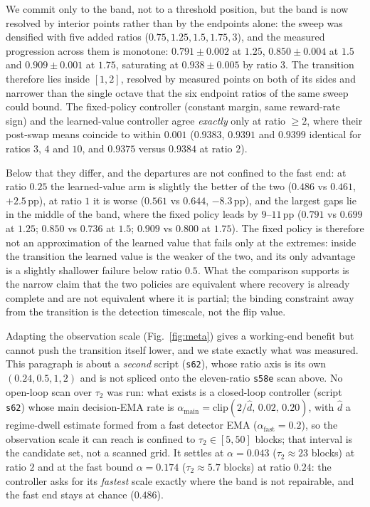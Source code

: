 \documentclass[preprint,12pt]{elsarticle}
\begin{document}
We commit only to the band, not to a
threshold position, but the band is now resolved by interior points rather
than by the endpoints alone: the sweep was densified with five added ratios
($0.75,1.25,1.5,1.75,3$), and the measured progression across them is
monotone: $0.791\pm0.002$ at $1.25$, $0.850\pm0.004$ at $1.5$ and
$0.909\pm0.001$ at $1.75$, saturating at $0.938\pm0.005$ by ratio $3$. The
transition therefore lies inside $[1,2]$, resolved by measured points on both
of its sides and narrower than the single octave that the six endpoint ratios
of the same sweep could bound. The fixed-policy controller (constant margin,
same reward-rate sign) and the learned-value controller agree
\emph{exactly} only at ratio $\geq2$, where their post-swap means coincide to
within $0.001$ ($0.9383$, $0.9391$ and $0.9399$ identical for ratios $3$, $4$
and $10$, and $0.9375$ versus $0.9384$ at ratio $2$).

Below that they differ, and the
departures are not confined to the fast end: at ratio $0.25$ the learned-value
arm is slightly the better of the two ($0.486$ vs $0.461$, $+2.5$\,pp), at
ratio $1$ it is worse ($0.561$ vs $0.644$, $-8.3$\,pp), and the largest gaps
lie in the middle of the band, where the fixed policy leads by $9$--$11$\,pp
($0.791$ vs $0.699$ at $1.25$; $0.850$ vs $0.736$ at $1.5$; $0.909$ vs $0.800$
at $1.75$). The fixed policy is therefore not an approximation of the learned
value that fails only at the extremes: inside the transition the learned value
is the weaker of the two, and its only advantage is a slightly shallower
failure below ratio $0.5$. What the comparison supports is the narrow claim
that the two policies are equivalent where recovery is already complete and
are not equivalent where it is partial; the binding constraint away from the
transition is the detection timescale, not the flip value.

Adapting the
observation scale (Fig.~\ref{fig:meta}) gives a working-end benefit but cannot
push the transition itself lower, and we state exactly what was measured.
This paragraph is about a \emph{second} script (\texttt{s62}), whose
ratio axis is its own $(0.24,0.5,1,2)$ and is not spliced onto the
eleven-ratio \texttt{s58e} scan above. No
open-loop scan over $\tau_2$ was run: what exists is a closed-loop controller
(script \texttt{s62}) whose main decision-EMA rate is
$\alpha_{\mathrm{main}}=\mathrm{clip}(2/\hat d,\,0.02,\,0.20)$, with $\hat d$ a
regime-dwell estimate formed from a fast detector EMA
($\alpha_{\mathrm{fast}}=0.2$), so the observation scale it can reach is
confined to $\tau_2\in[5,50]$ blocks; that interval is the candidate set,
not a scanned grid. It settles at $\alpha=0.043$ ($\tau_2\approx23$ blocks) at
ratio $2$ and at the fast bound $\alpha=0.174$ ($\tau_2\approx5.7$ blocks) at
ratio $0.24$: the controller asks for its \emph{fastest} scale exactly where
the band is not repairable, and the fast end stays at chance ($0.486$).
\end{document}
